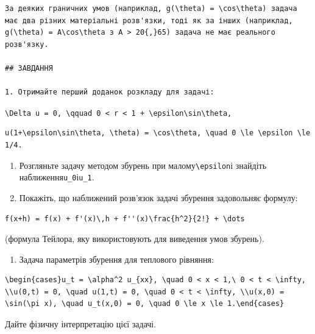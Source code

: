\documentclass[
  ukrainian,
]{article}
\providecommand{\tightlist}{%
  \setlength{\itemsep}{0pt}\setlength{\parskip}{0pt}}
\begin{document}
\begin{verbatim}
За деяких граничних умов (наприклад, g(\theta) = \cos\theta) задача має два різних матеріальні розв'язки, тоді як за інших (наприклад, g(\theta) = A\cos\theta з A > 20{,}65) задача не має реального розв'язку.

## ЗАВДАННЯ

1. Отримайте перший доданок розкладу для задачі:
\end{verbatim}

\texttt{\textbackslash{}Delta\ u\ =\ 0,\ \textbackslash{}qquad\ 0\ \textless{}\ r\ \textless{}\ 1\ +\ \textbackslash{}epsilon\textbackslash{}sin\textbackslash{}theta,}

\begin{verbatim}
u(1+\epsilon\sin\theta, \theta) = \cos\theta, \quad 0 \le \epsilon \le 1/4.
\end{verbatim}

\begin{enumerate}
\def\labelenumi{\arabic{enumi}.}
\setcounter{enumi}{1}
\item
  Розгляньте задачу методом збурень при
  малому\texttt{\textbackslash{}epsilon}і знайдіть
  наближення\texttt{u\_0}і\texttt{u\_1}.
\item
  Покажіть, що наближений розв'язок задачі збурення задовольняє формулу:
\end{enumerate}

\begin{verbatim}
f(x+h) = f(x) + f'(x)\,h + f''(x)\frac{h^2}{2!} + \dots
\end{verbatim}

(формула Тейлора, яку використовують для виведення умов збурень).

\begin{enumerate}
\def\labelenumi{\arabic{enumi}.}
\setcounter{enumi}{3}
\tightlist
\item
  Задача параметрів збурення для теплового рівняння:
\end{enumerate}

\begin{verbatim}
\begin{cases}u_t = \alpha^2 u_{xx}, \quad 0 < x < 1,\ 0 < t < \infty, \\u(0,t) = 0, \quad u(1,t) = 0, \quad 0 < t < \infty, \\u(x,0) = \sin(\pi x), \quad u_t(x,0) = 0, \quad 0 \le x \le 1.\end{cases}
\end{verbatim}

Дайте фізичну інтерпретацію цієї задачі.
\end{document}
